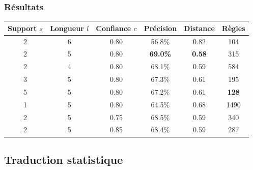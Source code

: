 \documentclass{beamer}
\begin{document}
\begin{frame}
\frametitle{Résultats}
\footnotesize
\begin{center}
\begin{tabular}{|c|c|c||c|c|c|}
\hline
Support $s$&Longueur $l$&Confiance $c$&Précision&Distance&Règles\\
\hline
2&6&0.80&56.8\%&0.82&104\\
\hline
2&5&0.80&\textbf{69.0\%}&\textbf{0.58}&315\\
\hline
2&4&0.80&68.1\%&0.59&584\\
\hline
\hline
3&5&0.80&67.3\%&0.61&195\\
\hline
5&5&0.80&67.2\%&0.61&\textbf{128}\\
\hline
1&5&0.80&64.5\%&0.68&1490\\
\hline
\hline
2&5&0.75&68.5\%&0.59&340\\
\hline
2&5&0.85&68.4\%&0.59&287\\
\hline
\end{tabular}
\end{center}
\normalsize
\end{frame}

\subsection{Traduction statistique}

\begin{frame}
\tableofcontents[sectionstyle=show/shaded, subsectionstyle=show/shaded/hide] 
\end{frame}
\end{document}
